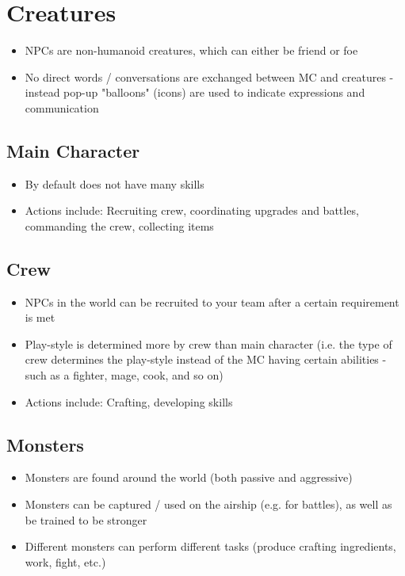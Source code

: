 \documentclass[a4paper]{scrreprt}
\begin{document}
\section{Creatures}
\begin{itemize}
\item NPCs are non-humanoid creatures, which can either be friend or foe
\item No direct words / conversations are exchanged between MC and creatures - instead pop-up "balloons" (icons) are used to indicate expressions and communication
\end{itemize}

\subsection{Main Character}
\begin{itemize}
\item By default does not have many skills
\item Actions include: Recruiting crew, coordinating upgrades and battles, commanding the crew, collecting items
\end{itemize}

\subsection{Crew}
\begin{itemize}
\item NPCs in the world can be recruited to your team after a certain requirement is met
\item Play-style is determined more by crew than main character (i.e. the type of crew determines the play-style instead of the MC having certain abilities - such as a fighter, mage, cook, and so on)
\item Actions include: Crafting, developing skills
\end{itemize}

\subsection{Monsters}
\begin{itemize}
\item Monsters are found around the world (both passive and aggressive)
\item Monsters can be captured / used on the airship (e.g. for battles), as well as be trained to be stronger
\item Different monsters can perform different tasks (produce crafting ingredients, work, fight, etc.)
\end{itemize}
\end{document}
